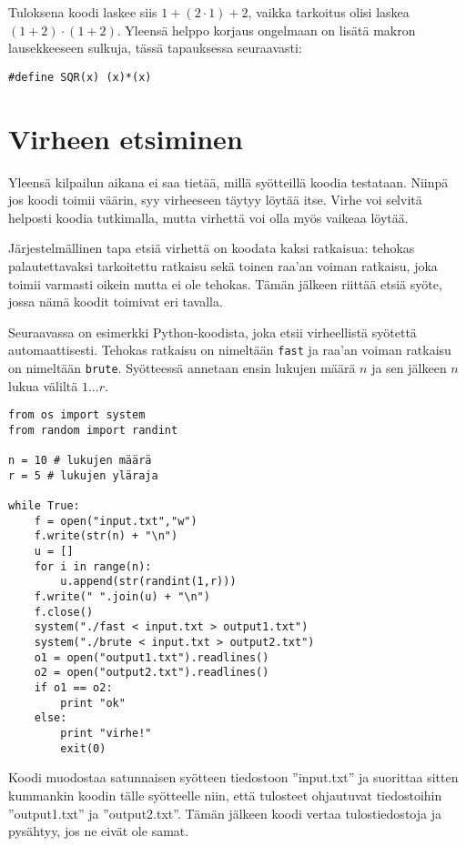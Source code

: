 Tuloksena koodi laskee siis $1+(2 \cdot 1)+2$,
vaikka tarkoitus olisi laskea $(1+2) \cdot (1+2)$.
Yleensä helppo korjaus ongelmaan on lisätä makron
lausekkeeseen sulkuja, tässä tapauksessa seuraavasti:

\begin{lstlisting}
#define SQR(x) (x)*(x)
\end{lstlisting}

\section{Virheen etsiminen}

Yleensä kilpailun aikana ei saa tietää,
millä syötteillä koodia testataan.
Niinpä jos koodi toimii väärin, syy virheeseen
täytyy löytää itse.
Virhe voi selvitä helposti koodia tutkimalla,
mutta virhettä voi olla myös vaikeaa löytää.

Järjestelmällinen tapa etsiä virhettä on koodata kaksi
ratkaisua: tehokas palautettavaksi tarkoitettu
ratkaisu sekä toinen raa'an voiman ratkaisu,
joka toimii varmasti oikein mutta ei ole tehokas.
Tämän jälkeen riittää etsiä syöte,
jossa nämä koodit toimivat eri tavalla.

Seuraavassa on esimerkki Python-koodista,
joka etsii virheellistä syötettä automaattisesti.
Tehokas ratkaisu on nimeltään \texttt{fast}
ja raa'an voiman ratkaisu on nimeltään \texttt{brute}.
Syötteessä annetaan ensin lukujen määrä $n$ ja
sen jälkeen $n$ lukua väliltä $1 \ldots r$.

\begin{lstlisting}
from os import system
from random import randint

n = 10 # lukujen määrä
r = 5 # lukujen yläraja

while True:
    f = open("input.txt","w")
    f.write(str(n) + "\n")
    u = []
    for i in range(n):
        u.append(str(randint(1,r)))
    f.write(" ".join(u) + "\n")
    f.close()
    system("./fast < input.txt > output1.txt")
    system("./brute < input.txt > output2.txt")
    o1 = open("output1.txt").readlines()
    o2 = open("output2.txt").readlines()
    if o1 == o2:
        print "ok"
    else:
        print "virhe!"
        exit(0)
\end{lstlisting}

Koodi muodostaa satunnaisen syötteen tiedostoon ''input.txt''
ja suorittaa sitten kummankin koodin tälle syötteelle
niin, että tulosteet ohjautuvat tiedostoihin
''output1.txt'' ja ''output2.txt''.
Tämän jälkeen koodi vertaa tulostiedostoja ja
pysähtyy, jos ne eivät ole samat.


